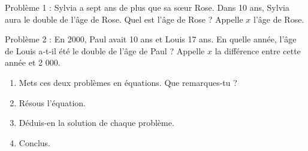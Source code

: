 \begin{activite}

\begin{cadre}
Problème 1 : Sylvia a sept ans de plus que sa sœur Rose. Dans 10 ans, Sylvia aura le double de l'âge de Rose. Quel est l'âge de Rose ? Appelle $x$ l'âge de Rose.
\end{cadre}

\begin{cadre}
Problème 2 : En 2000, Paul avait 10 ans et Louis 17 ans. En quelle année, l'âge de Louis a‑t‑il été le double de l'âge de Paul ? Appelle $x$ la différence entre cette année et 2 000.
\end{cadre}

\begin{enumerate}
\item Mets ces deux problèmes en équations. Que remarques-tu ?
\item Résous l'équation. 
\item Déduis-en la solution de chaque problème.
\item Conclus.
\end{enumerate}
\end{activite}
